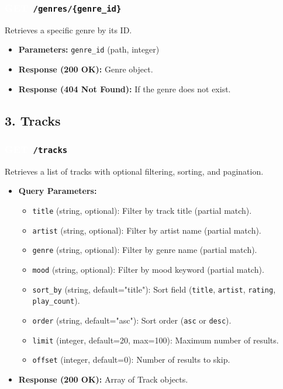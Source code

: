 \documentclass[11pt,a4paper]{article}
\newcommand{\methodGET}{\colorbox{getcolor}{\textcolor{white}{\textbf{GET}}}}
\begin{document}
\subsubsection*{\methodGET \texttt{ /genres/\{genre\_id\}}}
Retrieves a specific genre by its ID.
\begin{itemize}[label=\textcolor{primary}{\textbullet}, noitemsep]
    \item \textbf{Parameters:} \texttt{genre\_id} (path, integer)
    \item \textbf{Response (200 OK):} Genre object.
    \item \textbf{Response (404 Not Found):} If the genre does not exist.
\end{itemize}

\subsection{3. Tracks}

\subsubsection*{\methodGET \texttt{ /tracks}}
Retrieves a list of tracks with optional filtering, sorting, and pagination.
\begin{itemize}[label=\textcolor{primary}{\textbullet}, noitemsep]
    \item \textbf{Query Parameters:}
    \begin{itemize}[label=--, noitemsep]
        \item \texttt{title} (string, optional): Filter by track title (partial match).
        \item \texttt{artist} (string, optional): Filter by artist name (partial match).
        \item \texttt{genre} (string, optional): Filter by genre name (partial match).
        \item \texttt{mood} (string, optional): Filter by mood keyword (partial match).
        \item \texttt{sort\_by} (string, default="title"): Sort field (\texttt{title}, \texttt{artist}, \texttt{rating}, \texttt{play\_count}).
        \item \texttt{order} (string, default="asc"): Sort order (\texttt{asc} or \texttt{desc}).
        \item \texttt{limit} (integer, default=20, max=100): Maximum number of results.
        \item \texttt{offset} (integer, default=0): Number of results to skip.
    \end{itemize}
    \item \textbf{Response (200 OK):} Array of Track objects.
\end{itemize}
\end{document}
